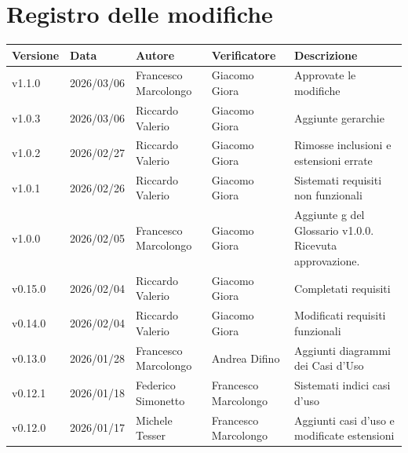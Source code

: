 ﻿\documentclass[a4paper,12pt]{article}
\newcommand{\DataUltimaModifica}{2026/03/06}
\newcommand{\VersioneDocumento}{v1.1.0} %
\begin{document}
\section*{Registro delle modifiche}
\begin{center}
    \begin{tabularx}{\textwidth}{|l|l|l|X|X|}
        \hline
        \rowcolor{lightgray}
        \textbf{Versione}  & \textbf{Data}       & \textbf{Autore}      & \textbf{Verificatore} & \textbf{Descrizione}                                        \\
        \hline
        \VersioneDocumento & \DataUltimaModifica & Francesco Marcolongo     & Giacomo Giora         & Approvate le modifiche                     \\
        \hline
        v1.0.3 & \DataUltimaModifica & Riccardo Valerio     & Giacomo Giora         & Aggiunte gerarchie                      \\
        \hline
        v1.0.2 & 2026/02/27 & Riccardo Valerio     & Giacomo Giora         & Rimosse inclusioni e estensioni errate                      \\
        \hline
        v1.0.1             & 2026/02/26          & Riccardo Valerio     & Giacomo Giora         & Sistemati requisiti non funzionali                          \\
        \hline
        v1.0.0             & 2026/02/05          & Francesco Marcolongo & Giacomo Giora         & Aggiunte g del Glossario v1.0.0. Ricevuta approvazione.     \\
        \hline
        v0.15.0            & 2026/02/04          & Riccardo Valerio     & Giacomo Giora         & Completati requisiti                                        \\
        \hline
        v0.14.0            & 2026/02/04          & Riccardo Valerio     & Giacomo Giora         & Modificati requisiti funzionali                             \\
        \hline
        v0.13.0            & 2026/01/28          & Francesco Marcolongo & Andrea Difino         & Aggiunti diagrammi dei Casi d'Uso                           \\
        \hline
        v0.12.1            & 2026/01/18          & Federico Simonetto   & Francesco Marcolongo  & Sistemati indici casi d'uso                                 \\
        \hline
        v0.12.0            & 2026/01/17          & Michele Tesser       & Francesco Marcolongo  & Aggiunti casi d'uso e modificate estensioni                 \\

\end{tabularx}
\end{center}
\end{document}
